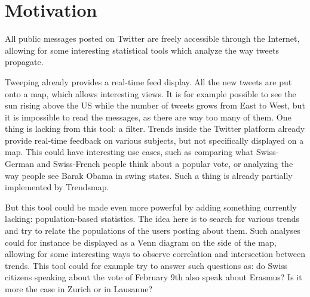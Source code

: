 \section{Motivation}
All public messages posted on Twitter are freely accessible through the Internet, allowing for some interesting statistical tools which analyze the way tweets propagate.

Tweeping already provides a real-time feed display. All the new tweets are put onto a map, which allows interesting views. It is for example possible to see the sun rising above the US while the number of tweets grows from East to West, but it is impossible to read the messages, as there are way too many of them. One thing is lacking from this tool: a filter. Trends inside the Twitter platform already provide real-time feedback on various subjects, but not specifically displayed on a map. This could have interesting use cases, such as comparing what Swiss-German and Swiss-French people think about a popular vote, or analyzing the way people see Barak Obama in swing states. Such a thing is already partially implemented by Trendsmap.

But this tool could be made even more powerful by adding something currently lacking: population-based statistics. The idea here is to search for various trends and try to relate the populations of the users posting about them. Such analyses could for instance be displayed as a Venn diagram on the side of the map, allowing for some interesting ways to observe correlation and intersection between trends. This tool could for example try to answer such questions as: do Swiss citizens speaking about the vote of February 9th also speak about Erasmus? Is it more the case in Zurich or in Lausanne?
